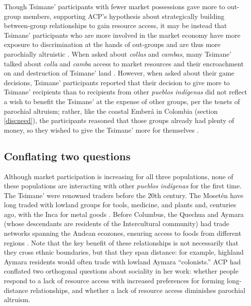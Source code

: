 \documentclass[bibauthoryear]{aa}
\begin{document}
Though Tsimane' participants with fewer market possessions gave more to out-group members, supporting ACP's hypothesis about strategically building between-group relationships to gain resource access, it may be instead that Tsimane' participants who are more involved in the market economy have more exposure to discrimination at the hands of out-groups and are thus more parochially altruistic \citep{pisor2018diversify}. When asked about \textit{collas} and \textit{cambas}, many Tsimane' talked about \textit{colla} and \textit{camba} access to market resources and their encroachment on and destruction of Tsimane' land \citep{pisor2018diversify}. However, when asked about their game decisions, Tsimane' participants reported that their decision to give more to Tsimane' recipients than to recipients from other \textit{pueblos ind\'igenas} did not reflect a wish to benefit the Tsimane' at the expense of other groups, per the tenets of parochial altruism; rather, like the coastal Ember\'a in Colombia (section \ref{discneed}), the participants reasoned that those groups already had plenty of money, so they wished to give the Tsimane' more for themselves \citep{Pisor2020}.
	

\subsection{Conflating two questions}\label{twoquest}

Although market participation is increasing for all three populations, none of these populations are interacting with other \textit{pueblos ind\'igenas} for the first time. The Tsimane' were renowned traders before the 20th century. The Moset\'en have long traded with lowland groups for tools, medicine, and plants \citep{lathrap1973antiquity, ringhofer2010exploring} and, centuries ago, with the Inca for metal goods \citep{godoy2015natural}. Before  Columbus, the Quechua and Aymara (whose descendants are residents of the Intercultural community) had trade networks spanning the Andean ecozones, ensuring access to foods from different regions \citep{klein2011concise}. Note that the key benefit of these relationships is not necessarily that they cross ethnic boundaries, but that they span distance: for example, highland Aymara residents would often trade with lowland Aymara ``colonists.'' ACP had conflated two orthogonal questions about sociality in her work: whether people respond to a lack of resource access with increased preferences for forming long-distance   relationships, and whether a lack of resource access diminishes parochial altruism.
\end{document}
